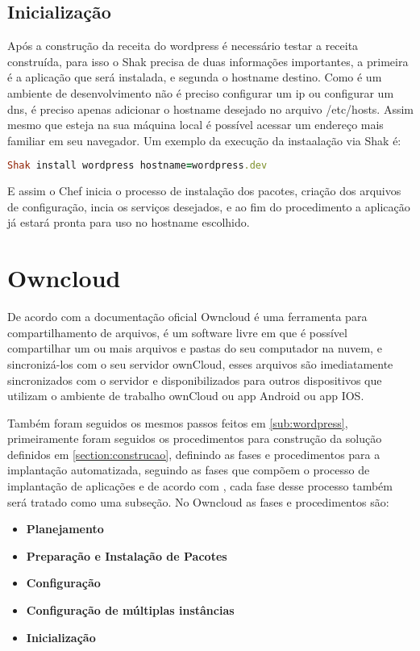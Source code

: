 \subsection{Inicialização}

Após a construção da receita do wordpress é necessário testar a receita construída,
para isso o Shak precisa de duas informações importantes, a primeira é a aplicação
que será instalada, e segunda o hostname destino. Como é um ambiente de desenvolvimento
não é preciso configurar um ip ou configurar um dns, é preciso apenas adicionar o
hostname desejado no arquivo /etc/hosts. Assim mesmo que esteja na sua máquina local
é possível acessar um endereço mais familiar em seu navegador. Um exemplo da execução
da instaalação via Shak é:

\begin{lstlisting}[language=Ruby,label=dice_index,caption={Exemplo de exexução de instalação do wordpress com shak}]
Shak install wordpress hostname=wordpress.dev
\end{lstlisting}

E assim o Chef inicia o processo de instalação dos pacotes, criação dos arquivos
de configuração, incia os serviços desejados, e ao fim do procedimento a aplicação
já estará pronta para uso no hostname escolhido.

\section{Owncloud}
\label{sub:owncloud}

De acordo com a documentação oficial \cite{owncloud} Owncloud é uma ferramenta
para compartilhamento de arquivos, é um software livre em que é possível compartilhar
um ou mais arquivos e pastas do seu computador na nuvem, e sincronizá-los com o seu
servidor ownCloud, esses arquivos são imediatamente sincronizados com o servidor
e disponibilizados para outros dispositivos que utilizam o ambiente de trabalho
ownCloud ou app Android ou app IOS.

Também foram seguidos os mesmos passos feitos em \ref{sub:wordpress}, primeiramente
foram seguidos os procedimentos para construção da solução definidos em \ref{section:construcao},
definindo as fases e procedimentos para a implantação automatizada, seguindo as
fases que compõem o processo de implantação de aplicações e de acordo com \cite{omg2006},
cada fase desse processo também será tratado como uma subseção. No Owncloud as
fases e procedimentos são:

\begin{itemize}
  \item  \textbf{Planejamento}
  \item  \textbf{Preparação e Instalação de Pacotes}
  \item  \textbf{Configuração}
  \item  \textbf{Configuração de múltiplas instâncias}
  \item  \textbf{Inicialização}
\end{itemize}

